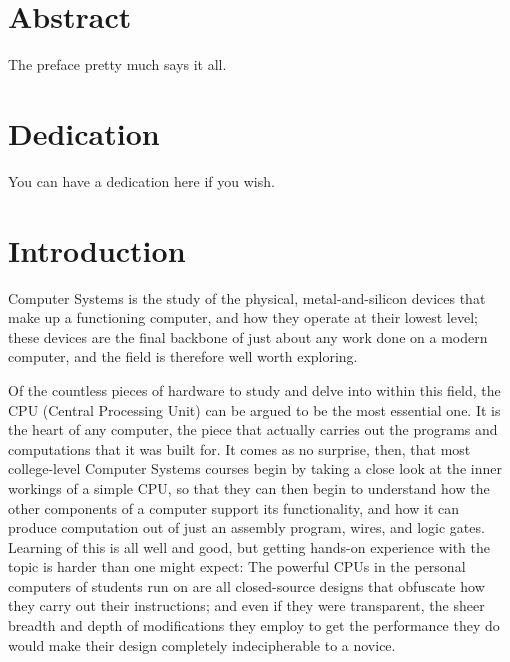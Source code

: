 \documentclass[12pt,twoside]{reedthesis}
\begin{document}
\chapter*{Abstract}
The preface pretty much says it all.

\chapter*{Dedication}
You can have a dedication here if you wish.

\mainmatter %
\pagestyle{fancyplain} %


\chapter*{Introduction}


Computer Systems is the study of the physical, metal-and-silicon devices that make up a functioning computer, and how they operate at their lowest level; these devices are the final backbone of just about any work done on a modern computer, and the field is therefore well worth exploring.

Of the countless pieces of hardware to study and delve into within this field, the CPU (Central Processing Unit) can be argued to be the most essential one. It is the heart of any computer, the piece that actually carries out the programs and computations that it was built for. It comes as no surprise, then, that most college-level Computer Systems courses begin by taking a close look at the inner workings of a simple CPU, so that they can then begin to understand how the other components of a computer support its functionality, and how it can produce computation out of just an assembly program, wires, and logic gates. Learning of this is all well and good, but getting hands-on experience with the topic is harder than one might expect: The powerful CPUs in the personal computers of students run on are all closed-source designs that obfuscate how they carry out their instructions; and even if they were transparent, the sheer breadth and depth of modifications they employ to get the performance they do would make their design completely indecipherable to a novice.
\end{document}
